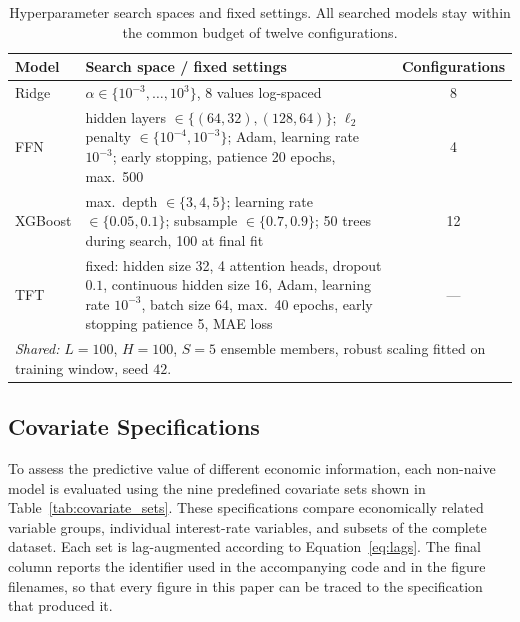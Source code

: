 \documentclass[11pt,a4paper]{article}
\begin{document}
\begin{table}[htbp]
    \centering
    \small
    \caption{Hyperparameter search spaces and fixed settings. All searched
    models stay within the common budget of twelve configurations.}
    \label{tab:hyperparams}
    \begin{tabularx}{\textwidth}{l X c}
        \toprule
        Model & Search space / fixed settings & Configurations \\
        \midrule
        Ridge & $\alpha \in \{10^{-3}, \dots, 10^{3}\}$, 8 values log-spaced & 8 \\
        FFN & hidden layers $\in \{(64,32),(128,64)\}$;
              $\ell_2$ penalty $\in \{10^{-4}, 10^{-3}\}$;
              Adam, learning rate $10^{-3}$;
              early stopping, patience 20 epochs, max.\ 500 & 4 \\
        XGBoost & max.\ depth $\in \{3,4,5\}$;
                  learning rate $\in \{0.05, 0.1\}$;
                  subsample $\in \{0.7, 0.9\}$;
                  50 trees during search, 100 at final fit & 12 \\
        TFT & fixed: hidden size 32, 4 attention heads, dropout $0.1$,
              continuous hidden size 16, Adam, learning rate $10^{-3}$,
              batch size 64, max.\ 40 epochs, early stopping patience 5,
              MAE loss & --- \\
        \midrule
        \multicolumn{3}{l}{\textit{Shared:} $L=100$, $H=100$, $S=5$ ensemble
        members, robust scaling fitted on training window, seed $42$.} \\
        \bottomrule
    \end{tabularx}
\end{table}

\subsection{Covariate Specifications}
\label{subsec:covariates}

To assess the predictive value of different economic information, each
non-naive model is evaluated using the nine predefined covariate sets shown in
Table~\ref{tab:covariate_sets}. These specifications compare economically
related variable groups, individual interest-rate variables, and subsets of
the complete dataset. Each set is lag-augmented according to
Equation~\eqref{eq:lags}. The final column reports the identifier used in the
accompanying code and in the figure filenames, so that every figure in this
paper can be traced to the specification that produced it.
\end{document}
